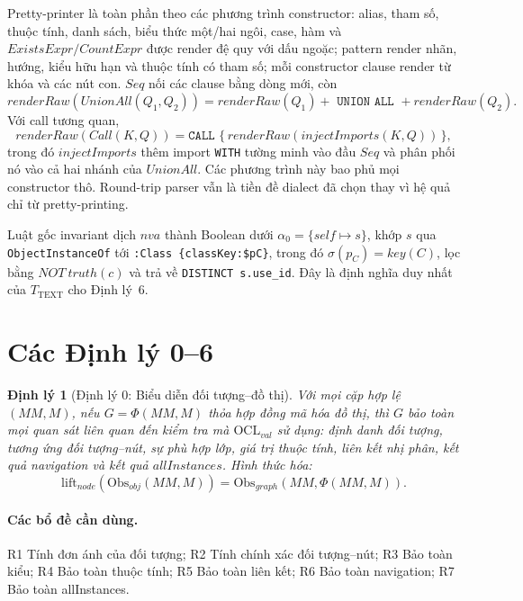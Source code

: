 \documentclass[11pt,a4paper]{article}
\newtheorem{theorem}{Định lý}
\theoremstyle{definition}
\newcommand{\OCLval}{\mathrm{OCL}_{val}}
\newcommand{\PhiEnc}{\Phi}
\newcommand{\ObsObj}{\mathrm{Obs}_{obj}}
\newcommand{\ObsGraph}{\mathrm{Obs}_{graph}}
\newcommand{\liftNode}{\mathrm{lift}_{node}}
\begin{document}
Pretty-printer là toàn phần theo các phương trình constructor: alias, tham số,
thuộc tính, danh sách, biểu thức một/hai ngôi, case, hàm và
$ExistsExpr/CountExpr$ được render đệ quy với dấu ngoặc; pattern render nhãn,
hướng, kiểu hữu hạn và thuộc tính có tham số; mỗi constructor clause render từ
khóa và các nút con. $Seq$ nối các clause bằng dòng mới, còn
\[
renderRaw(UnionAll(Q_1,Q_2))=
renderRaw(Q_1)\mathbin{+}\texttt{ UNION ALL }\mathbin{+}renderRaw(Q_2).
\]
Với call tương quan,
\[
renderRaw(Call(K,Q))=
\texttt{CALL \{}\,renderRaw(injectImports(K,Q))\,\texttt{\}},
\]
trong đó $injectImports$ thêm import \texttt{WITH} tường minh vào đầu $Seq$ và
phân phối nó vào cả hai nhánh của $UnionAll$. Các phương trình này bao phủ mọi
constructor thô. Round-trip parser vẫn là tiền đề dialect đã chọn thay vì hệ
quả chỉ từ pretty-printing.

Luật gốc invariant dịch $nva$ thành Boolean dưới
$\alpha_0=\{self\mapsto s\}$, khớp $s$ qua \texttt{ObjectInstanceOf} tới
\texttt{:Class \{classKey:\$pC\}}, trong đó $\sigma(p_C)=key(C)$, lọc bằng
$NOT\ truth(c)$ và trả về \texttt{DISTINCT s.use\_id}. Đây là định nghĩa duy
nhất của $T_{\mathrm{TEXT}}$ cho Định lý~6.

\section{Các Định lý 0--6}

\begin{theorem}[Định lý 0: Biểu diễn đối tượng--đồ thị]
Với mọi cặp hợp lệ $(MM,M)$, nếu $G=\PhiEnc(MM,M)$ thỏa hợp đồng mã hóa đồ
thị, thì $G$ bảo toàn mọi quan sát liên quan đến kiểm tra mà $\OCLval$ sử dụng:
định danh đối tượng, tương ứng đối tượng--nút, sự phù hợp lớp, giá trị thuộc
tính, liên kết nhị phân, kết quả navigation và kết quả $allInstances$. Hình
thức hóa:
\[
\liftNode(\ObsObj(MM,M))=\ObsGraph(MM,\PhiEnc(MM,M)).
\]
\end{theorem}

\paragraph{Các bổ đề cần dùng.}
R1 Tính đơn ánh của đối tượng; R2 Tính chính xác đối tượng--nút; R3 Bảo toàn
kiểu; R4 Bảo toàn thuộc tính; R5 Bảo toàn liên kết; R6 Bảo toàn navigation; R7
Bảo toàn allInstances.
\end{document}
